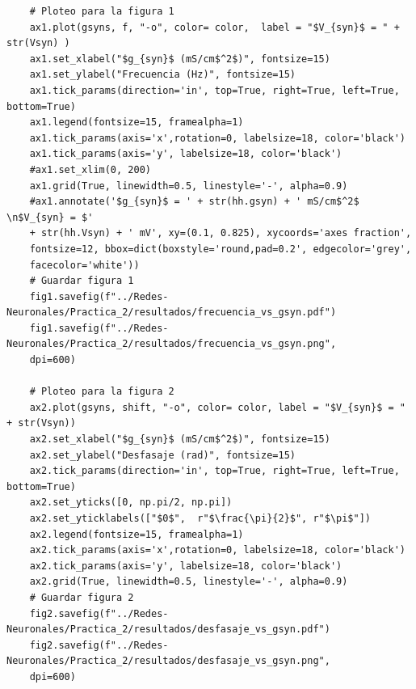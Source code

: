 \documentclass[11pt,twocolumn,twoside]{opticajnl}
\begin{document}
\begin{onecolumn}
\begin{lstlisting}
    # Ploteo para la figura 1
    ax1.plot(gsyns, f, "-o", color= color,  label = "$V_{syn}$ = " + str(Vsyn) )
    ax1.set_xlabel("$g_{syn}$ (mS/cm$^2$)", fontsize=15)
    ax1.set_ylabel("Frecuencia (Hz)", fontsize=15)
    ax1.tick_params(direction='in', top=True, right=True, left=True, bottom=True)
    ax1.legend(fontsize=15, framealpha=1)
    ax1.tick_params(axis='x',rotation=0, labelsize=18, color='black')
    ax1.tick_params(axis='y', labelsize=18, color='black')
    #ax1.set_xlim(0, 200)
    ax1.grid(True, linewidth=0.5, linestyle='-', alpha=0.9)
    #ax1.annotate('$g_{syn}$ = ' + str(hh.gsyn) + ' mS/cm$^2$ \n$V_{syn} = $' 
    + str(hh.Vsyn) + ' mV', xy=(0.1, 0.825), xycoords='axes fraction', 
    fontsize=12, bbox=dict(boxstyle='round,pad=0.2', edgecolor='grey',
    facecolor='white'))
    # Guardar figura 1
    fig1.savefig(f"../Redes-Neuronales/Practica_2/resultados/frecuencia_vs_gsyn.pdf")
    fig1.savefig(f"../Redes-Neuronales/Practica_2/resultados/frecuencia_vs_gsyn.png",
    dpi=600)

    # Ploteo para la figura 2
    ax2.plot(gsyns, shift, "-o", color= color, label = "$V_{syn}$ = " + str(Vsyn))
    ax2.set_xlabel("$g_{syn}$ (mS/cm$^2$)", fontsize=15)
    ax2.set_ylabel("Desfasaje (rad)", fontsize=15)
    ax2.tick_params(direction='in', top=True, right=True, left=True, bottom=True)
    ax2.set_yticks([0, np.pi/2, np.pi])
    ax2.set_yticklabels(["$0$",  r"$\frac{\pi}{2}$", r"$\pi$"])
    ax2.legend(fontsize=15, framealpha=1)
    ax2.tick_params(axis='x',rotation=0, labelsize=18, color='black')
    ax2.tick_params(axis='y', labelsize=18, color='black')
    ax2.grid(True, linewidth=0.5, linestyle='-', alpha=0.9)
    # Guardar figura 2
    fig2.savefig(f"../Redes-Neuronales/Practica_2/resultados/desfasaje_vs_gsyn.pdf")
    fig2.savefig(f"../Redes-Neuronales/Practica_2/resultados/desfasaje_vs_gsyn.png",
    dpi=600)
\end{lstlisting}
\end{onecolumn}
\end{document}
